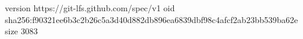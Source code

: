version https://git-lfs.github.com/spec/v1
oid sha256:f90321ee6b3c2b26c5a3d40d882db896ea6839dbf98c4afcf2ab23bb539ba62e
size 3083
